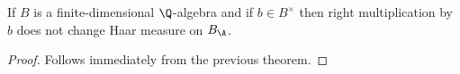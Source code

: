   \begin{corollary}
    \label{NumberField.AdeleRing.addEquivAddHaarChar_mulRight_unit_eq_one}
    If $B$ is a finite-dimensional $\Q$-algebra and
    if $b\in B^\times$ then right multiplication by $b$
    does not change Haar measure on $B_{\A}$.
  \end{corollary}
  \begin{proof}
    Follows immediately from the previous theorem.
  \end{proof}
